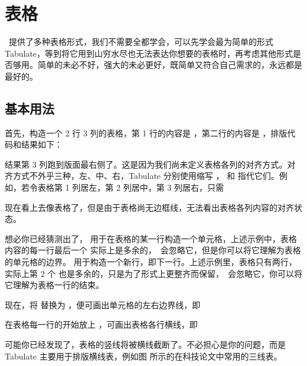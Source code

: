 \chapter{表格}

\ConTeXt\ 提供了多种表格形式，我们不需要全都学会，可以先学会最为简单的形式 Tabulate，等到将它用到山穷水尽也无法表达你想要的表格时，再考虑其他形式是否够用。简单的未必不好，强大的未必更好，既简单又符合自己需求的，永远都是最好的。

\section{基本用法}

首先，构造一个 2 行 3 列的表格，第 1 行的内容是 ，第二行的内容是 ，排版代码和结果如下：

\startsample
\starttabulate
{}  \NC\NR
{}  \NC\NR
\stoptabulate
\stopsample
\simplesample[TEX]{\null}
\getsample

\noindent 结果第 3 列跑到版面最右侧了。这是因为我们尚未定义表格各列的对齐方式。对齐方式不外乎三种，左、中、右，Tabulate 分别使用缩写 ， 和  指代它们。例如，若令表格第 1 列居左，第 2 列居中，第 3 列居右，只需

\startsample
\starttabulate[|l|c|r|]
  \NC\NR
{}  \NC\NR
\stoptabulate
\stopsample
\simplesample[TEX]{\getsample}
\noindent 现在看上去像表格了，但是由于表格尚无边框线，无法看出表格各列内容的对齐状态。

想必你已经猜测出了，\type{\NC} 用于在表格的某一行构造一个单元格，上述示例中，表格内容的每一行最后一个 \type{\NC} 实际上是多余的，\ConTeXt\ 会忽略它，但是你可以将它理解为表格的单元格的边界。\type{\NR} 用于构造一个新行，即下一行。上述示例里，表格只有两行，实际上第 2 个 \type{\NR} 也是多余的，只是为了形式上更整齐而保留，\ConTeXt\ 会忽略它，你可以将它理解为表格一行的结束。

现在，将 \type{\NC} 替换为 \type{\VL}，便可画出单元格的左右边界线，即

\startsample
\starttabulate[|l|c|r|]
  \VL\NR
{}  \VL\NR
\stoptabulate
\stopsample
\simplesample[TEX]{\getsample}

\noindent 在表格每一行的开始放上 \type{\HL}，可画出表格各行横线，即

\startsample
\starttabulate[|l|c|r|]
\HL
{}  \VL\NR
\HL
{}  \VL\NR
\HL
\stoptabulate
\stopsample
\simplesample[TEX]{\getsample}

\noindent 可能你已经发现了，表格的竖线将被横线截断了。不必担心是你的问题，而是 Tabulate 主要用于排版横线表，例如图  所示的在科技论文中常用的三线表。

